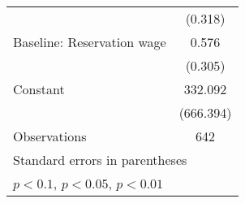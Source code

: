 {\begin{tabular*}{1in}{@{\hskip\tabcolsep\extracolsep\fill}l*{1}{c}}
                    &     (0.318)         \\
[1em]
Baseline: Reservation wage&       0.576         \\
                    &     (0.305)\sym{*}  \\
[1em]
Constant            &     332.092         \\
                    &   (666.394)         \\
\hline
Observations        &         642         \\
\hline\hline
\multicolumn{2}{l}{\footnotesize Standard errors in parentheses}\\
\multicolumn{2}{l}{\footnotesize \sym{*} \(p<0.1\), \sym{**} \(p<0.05\), \sym{***} \(p<0.01\)}\\
\end{tabular*}
}
